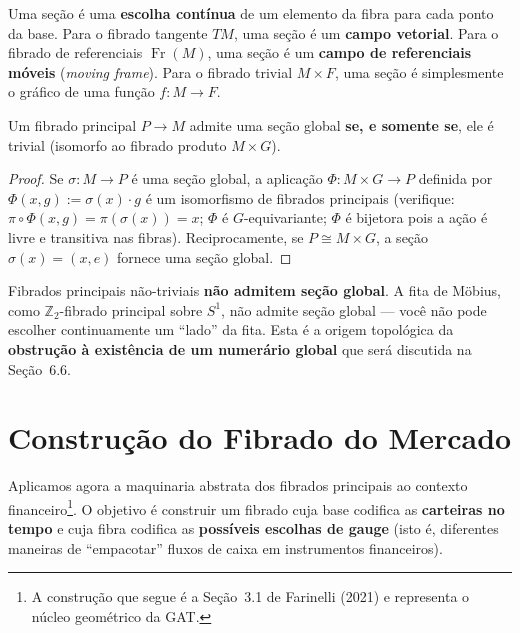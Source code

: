 \begin{obs}[Intui\c{c}\~ao]
Uma se\c{c}\~ao \'e uma \textbf{escolha cont\'inua} de um elemento da fibra
para cada ponto da base. Para o fibrado tangente $TM$, uma se\c{c}\~ao \'e um
\textbf{campo vetorial}. Para o fibrado de referenciais $\operatorname{Fr}(M)$,
uma se\c{c}\~ao \'e um \textbf{campo de referenciais m\'oveis} (\textit{moving
frame}). Para o fibrado trivial $M \times F$, uma se\c{c}\~ao \'e simplesmente
o gr\'afico de uma fun\c{c}\~ao $f: M \to F$.
\end{obs}

\begin{prop}\label{prop:secao}
Um fibrado principal $P \to M$ admite uma se\c{c}\~ao global \textbf{se, e
somente se}, ele \'e trivial (isomorfo ao fibrado produto $M \times G$).
\end{prop}
\begin{proof}
Se $\sigma: M \to P$ \'e uma se\c{c}\~ao global, a aplica\c{c}\~ao
$\Phi: M \times G \to P$ definida por $\Phi(x, g) := \sigma(x) \cdot g$
\'e um isomorfismo de fibrados principais (verifique:
$\pi \circ \Phi(x, g) = \pi(\sigma(x)) = x$; $\Phi$ \'e $G$-equivariante;
$\Phi$ \'e bijetora pois a a\c{c}\~ao \'e livre e transitiva nas fibras).
Reciprocamente, se $P \cong M \times G$, a se\c{c}\~ao $\sigma(x) = (x, e)$
fornece uma se\c{c}\~ao global.
\end{proof}

\begin{obs}
Fibrados principais n\~ao-triviais \textbf{n\~ao admitem se\c{c}\~ao global}.
A fita de M\"obius, como $\mathbb{Z}_2$-fibrado principal sobre $S^1$, n\~ao
admite se\c{c}\~ao global --- voc\^e n\~ao pode escolher continuamente um
``lado'' da fita. Esta \'e a origem topol\'ogica da \textbf{obstru\c{c}\~ao
\`a exist\^encia de um numer\'ario global} que ser\'a discutida na
Se\c{c}\~ao~6.6.
\end{obs}

\section{Constru\c{c}\~ao do Fibrado do Mercado}

Aplicamos agora a maquinaria abstrata dos fibrados principais ao contexto
financeiro\footnote{A constru\c{c}\~ao que segue \'e a Se\c{c}\~ao~3.1 de
Farinelli (2021) e representa o n\'ucleo geom\'etrico da GAT.}. O objetivo
\'e construir um fibrado cuja base codifica as \textbf{carteiras no tempo}
e cuja fibra codifica as \textbf{poss\'iveis escolhas de gauge} (isto \'e,
diferentes maneiras de ``empacotar'' fluxos de caixa em instrumentos
financeiros).

